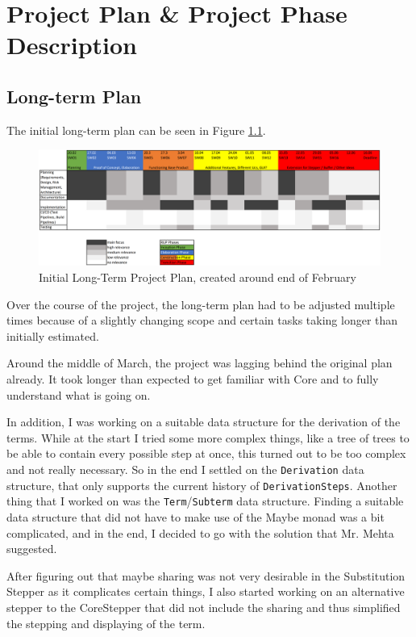 \chapter{Project Plan \& Project Phase Description}

\section{Long-term Plan}

The initial long-term plan can be seen in Figure \ref*{fig:longTermPlan}.

\begin{figure}[!ht]
    \centering
    \includegraphics[width=0.96\textheight,angle=270]{resources/LongTermPlan.PNG}
    \caption{Initial Long-Term Project Plan, created around end of February}
    \label{fig:longTermPlan}
\end{figure}

Over the course of the project,
the long-term plan had to be adjusted multiple times because of a slightly changing scope and certain tasks taking longer than initially estimated.

Around the middle of March, the project was lagging behind the original plan already.
It took longer than expected to get familiar with Core and to fully understand what is going on.

In addition, I was working on a suitable data structure for the derivation of the terms.
While at the start I tried some more complex things,
like a tree of trees to be able to contain every possible step at once,
this turned out to be too complex and not really necessary.
So in the end I settled on the \texttt{Derivation} data structure,
that only supports the current history of \texttt{DerivationSteps}.
Another thing that I worked on was the \texttt{Term}/\texttt{Subterm} data structure.
Finding a suitable data structure that did not have to make use of the Maybe monad was a bit complicated,
and in the end,
I decided to go with the solution that Mr. Mehta suggested.

After figuring out that maybe sharing was not very desirable in the Substitution Stepper as it complicates certain things,
I also started working on an alternative stepper to the CoreStepper that did not include the sharing and thus simplified the stepping and displaying of the term.

